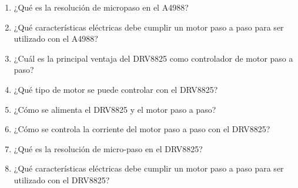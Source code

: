 \documentclass[../main]{subfiles}
\begin{document}
\begin{enumerate}
    \item ¿Qué es la resolución de micropaso en el A4988?
    
    \item ¿Qué características eléctricas debe cumplir un motor paso a paso para ser utilizado con el A4988?
    
    \item ¿Cuál es la principal ventaja del DRV8825 como controlador de motor paso a paso?
    \item ¿Qué tipo de motor se puede controlar con el DRV8825?
    \item ¿Cómo se alimenta el DRV8825 y el motor paso a paso?
    \item ¿Cómo se controla la corriente del motor paso a paso con el DRV8825?
    \item ¿Qué es la resolución de micro-paso en el DRV8825?
    \item ¿Qué características eléctricas debe cumplir un motor paso a paso para ser utilizado con el DRV8825?
\end{enumerate}
\end{document}
